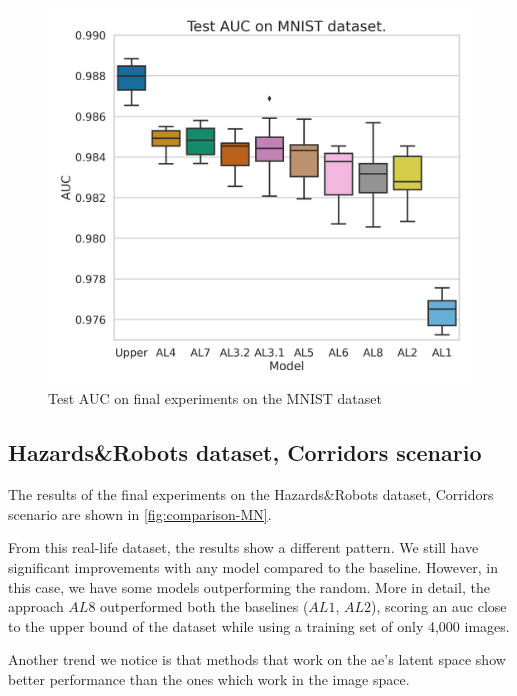             \begin{figure}[H]
                \centering
                \centerline{\includegraphics[width=\textwidth]{img/results/final_MNIST.png}}
                \caption{Test AUC on final experiments on the MNIST dataset}
                \label{fig:comparison-MN}
            \end{figure}
        
        \subsection{Hazards\&Robots dataset, Corridors scenario}
            The results of the final experiments on the Hazards\&Robots dataset, Corridors scenario are shown in \autoref{fig:comparison-MN}.
            
            
            From this real-life dataset, the results show a different pattern. We still have significant improvements with any model compared to the baseline. However, in this case, we have some models outperforming the random. More in detail, the approach $AL8$ outperformed both the baselines ($AL1$, $AL2$), scoring an \acrshort{auc} close to the upper bound of the dataset while using a training set of only 4,000 images.
            
            Another trend we notice is that methods that work on the \acrshort{ae}'s latent space show better performance than the ones which work in the image space.
            
